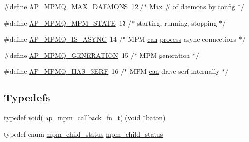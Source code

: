 \begin{DoxyCompactItemize}
\item 
\#define \hyperlink{group__APACHE__CORE__MPM_gab197cdf5afdc3ad5311771f56e2f5673}{A\+P\+\_\+\+M\+P\+M\+Q\+\_\+\+M\+A\+X\+\_\+\+D\+A\+E\+M\+O\+NS}~12  /$\ast$ Max \# \hyperlink{pcre_8txt_a9d5b55a535a7d176d14b62d664b47b4d}{of} daemons by config   $\ast$/
\item 
\#define \hyperlink{group__APACHE__CORE__MPM_ga23b4d0d157612a17d54685fcd97d0341}{A\+P\+\_\+\+M\+P\+M\+Q\+\_\+\+M\+P\+M\+\_\+\+S\+T\+A\+TE}~13  /$\ast$ starting, running, stopping  $\ast$/
\item 
\#define \hyperlink{group__APACHE__CORE__MPM_ga4205e6b9586698b6ab394cd0fba29d63}{A\+P\+\_\+\+M\+P\+M\+Q\+\_\+\+I\+S\+\_\+\+A\+S\+Y\+NC}~14  /$\ast$ M\+PM \hyperlink{pcre_8txt_a2a892895a50bc58f3679c7acb58190e6}{can} \hyperlink{pcretest_8txt_a8ec73ad58a04604170bd96796a2075a8}{process} async connections  $\ast$/
\item 
\#define \hyperlink{group__APACHE__CORE__MPM_gaa645a150212b7d85c5d59dccc1cff696}{A\+P\+\_\+\+M\+P\+M\+Q\+\_\+\+G\+E\+N\+E\+R\+A\+T\+I\+ON}~15  /$\ast$ M\+PM generation $\ast$/
\item 
\#define \hyperlink{group__APACHE__CORE__MPM_ga366bfce5fc100e613d018b1b26537600}{A\+P\+\_\+\+M\+P\+M\+Q\+\_\+\+H\+A\+S\+\_\+\+S\+E\+RF}~16  /$\ast$ M\+PM \hyperlink{pcre_8txt_a2a892895a50bc58f3679c7acb58190e6}{can} drive serf internally  $\ast$/
\end{DoxyCompactItemize}
\subsection*{Typedefs}
\begin{DoxyCompactItemize}
\item 
typedef \hyperlink{group__MOD__ISAPI_gacd6cdbf73df3d9eed42fa493d9b621a6}{void}( \hyperlink{group__APACHE__CORE__MPM_ga0ca31a834a87abfb20d959041aa57de0}{ap\+\_\+mpm\+\_\+callback\+\_\+fn\+\_\+t}) (\hyperlink{group__MOD__ISAPI_gacd6cdbf73df3d9eed42fa493d9b621a6}{void} $\ast$\hyperlink{group__APR__Util__RC_ga37840dc44e2b0b5a127a6828fffe2a8c}{baton})
\item 
typedef enum \hyperlink{group__APACHE__CORE__MPM_ga2ad69bc5389eabd0ec49889d8bf67be3}{mpm\+\_\+child\+\_\+status} \hyperlink{group__APACHE__CORE__MPM_ga5cd87e05067dc78e1da7056355c98c47}{mpm\+\_\+child\+\_\+status}
\end{DoxyCompactItemize}

